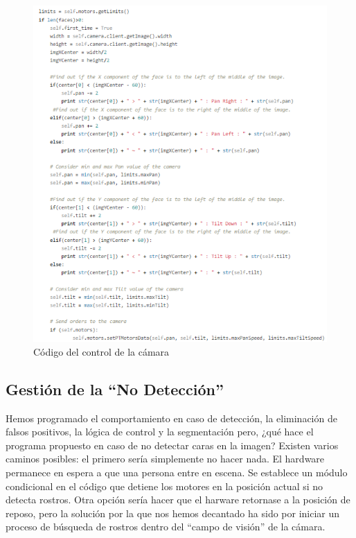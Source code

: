 \begin{figure}[H]
  \begin{center}
    \includegraphics[width=0.98\linewidth]{figures/snippet1ff.png}
		\caption{Código del control de la cámara}
		\label{fig.snippet1ff}
		\end{center}
\end{figure}

\subsection{Gestión de la ``No Detección''}
Hemos programado el comportamiento en caso de detección, la eliminación de falsos positivos, la lógica de control y la segmentación pero, ¿qué hace el programa propuesto en caso de no detectar caras en la imagen? Existen varios caminos posibles: el primero sería simplemente no hacer nada. El hardware permanece en espera a que una persona entre en escena. Se establece un módulo condicional en el código que detiene los motores en la posición actual si no detecta rostros. Otra opción sería hacer que el harware retornase a la posición de reposo, pero la solución por la que nos hemos decantado ha sido por iniciar un proceso de búsqueda de rostros dentro del “campo de visión” de la cámara. 


